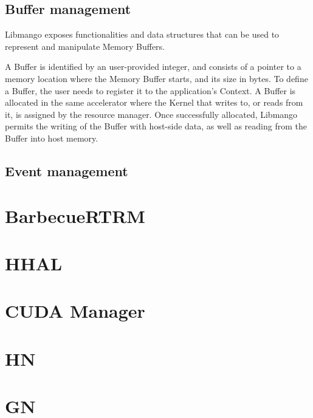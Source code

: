 \subsection{Buffer management}
Libmango exposes functionalities and data structures that can be used to represent and manipulate Memory Buffers.

A Buffer is identified by an user-provided integer, and consists of a pointer to a memory location where the Memory Buffer starts, and its size in bytes. 
To define a Buffer, the user needs to register it to the application's Context. A Buffer is allocated in the same accelerator where the Kernel that writes to, or reads from it, is assigned by the resource manager.
Once successfully allocated, Libmango permits the writing of the Buffer with host-side data, as well as reading from the Buffer into host memory.


\subsection{Event management}


\section{BarbecueRTRM}

\section{HHAL}

\section{CUDA Manager}

\section{HN}

\section{GN}